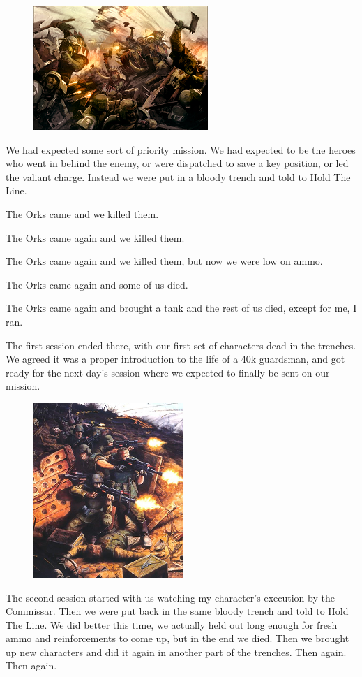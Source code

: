 \begin{figure}
	\begin{center}
		\includegraphics[width=\figwidth]{pics/1/2.png}
	\end{center}
\end{figure}
We had expected some sort of priority mission.
We had expected to be the heroes who went in behind the enemy, or were dispatched to save a key position, or led the valiant charge.
Instead we were put in a bloody trench and told to Hold The Line.

The Orks came and we killed them. 

The Orks came again and we killed them.

The Orks came again and we killed them, but now we were low on ammo.

The Orks came again and some of us died.

The Orks came again and brought a tank and the rest of us died, except for me, I ran.

The first session ended there, with our first set of characters dead in the trenches.
We agreed it was a proper introduction to the life of a 40k guardsman, and got ready for the next day's session where we expected to finally be sent on our mission.

\begin{figure}
	\begin{center}
		\includegraphics[width=\figwidth]{pics/1/3.png}
	\end{center}
\end{figure}
The second session started with us watching my character's execution by the Commissar.
Then we were put back in the same bloody trench and told to Hold The Line.
We did better this time, we actually held out long enough for fresh ammo and reinforcements to come up, but in the end we died.
Then we brought up new characters and did it again in another part of the trenches.
Then again.
Then again.

